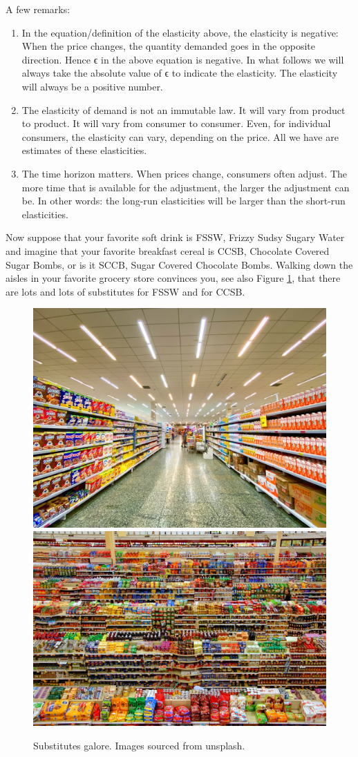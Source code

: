 \documentclass[
]{book}
\begin{document}
A few remarks:

\begin{enumerate}
\def\labelenumi{\arabic{enumi}.}
\item
  In the equation/definition of the elasticity above, the elasticity is negative: When the price changes, the quantity demanded goes in the opposite direction. Hence ϵ in the above equation is negative. In what follows we will always take the absolute value of ϵ to indicate the elasticity. The elasticity will always be a positive number.
\item
  The elasticity of demand is not an immutable law. It will vary from product to product. It will vary from consumer to consumer. Even, for individual consumers, the elasticity can vary, depending on the price. All we have are estimates of these elasticities.
\item
  The time horizon matters. When prices change, consumers often adjust. The more time that is available for the adjustment, the larger the adjustment can be. In other words: the long-run elasticities will be larger than the short-run elasticities.
\end{enumerate}

Now suppose that your favorite soft drink is FSSW, Frizzy Sudsy Sugary Water and imagine that your favorite breakfast cereal is CCSB, Chocolate Covered Sugar Bombs, or is it SCCB, Sugar Covered Chocolate Bombs. Walking down the aisles in your favorite grocery store convinces you, see also Figure \ref{fig:fig305}, that there are lots and lots of substitutes for FSSW and for CCSB.

\begin{figure}

{\centering \includegraphics[width=0.45\linewidth]{img/ch3/fig5} \includegraphics[width=0.45\linewidth]{img/ch3/fig5b} 

}

\caption{Substitutes galore. Images sourced from unsplash.}\label{fig:fig305}
\end{figure}
\end{document}
